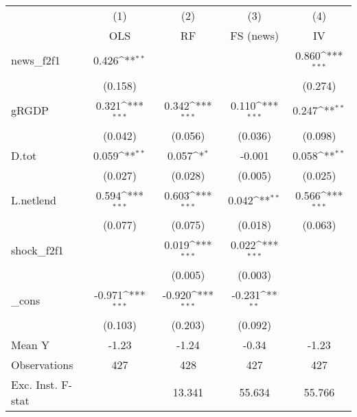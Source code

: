 {
\def\sym#1{\ifmmode^{#1}\else\(^{#1}\)\fi}
\begin{tabular}{l*{4}{c}}
\toprule
            &\multicolumn{1}{c}{(1)}&\multicolumn{1}{c}{(2)}&\multicolumn{1}{c}{(3)}&\multicolumn{1}{c}{(4)}\\
            &\multicolumn{1}{c}{OLS}&\multicolumn{1}{c}{RF}&\multicolumn{1}{c}{FS (news)}&\multicolumn{1}{c}{IV}\\
\midrule
news\_f2f1   &       0.426\sym{**} &                     &                     &       0.860\sym{***}\\
            &     (0.158)         &                     &                     &     (0.274)         \\
\addlinespace
gRGDP       &       0.321\sym{***}&       0.342\sym{***}&       0.110\sym{***}&       0.247\sym{**} \\
            &     (0.042)         &     (0.056)         &     (0.036)         &     (0.098)         \\
\addlinespace
D.tot       &       0.059\sym{**} &       0.057\sym{*}  &      -0.001         &       0.058\sym{**} \\
            &     (0.027)         &     (0.028)         &     (0.005)         &     (0.025)         \\
\addlinespace
L.netlend   &       0.594\sym{***}&       0.603\sym{***}&       0.042\sym{**} &       0.566\sym{***}\\
            &     (0.077)         &     (0.075)         &     (0.018)         &     (0.063)         \\
\addlinespace
shock\_f2f1  &                     &       0.019\sym{***}&       0.022\sym{***}&                     \\
            &                     &     (0.005)         &     (0.003)         &                     \\
\addlinespace
\_cons      &      -0.971\sym{***}&      -0.920\sym{***}&      -0.231\sym{**} &                     \\
            &     (0.103)         &     (0.203)         &     (0.092)         &                     \\
\midrule
Mean Y      &       -1.23         &       -1.24         &       -0.34         &       -1.23         \\
Observations&         427         &         428         &         427         &         427         \\
Exc. Inst. F-stat&                     &      13.341         &      55.634         &      55.766         \\
\bottomrule
\end{tabular}
}
